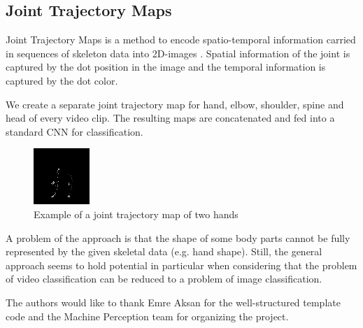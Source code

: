 \subsection{Joint Trajectory Maps}
Joint Trajectory Maps is a method to encode spatio-temporal information carried in sequences of skeleton data into 2D-images \cite{JointTrajectoryMaps16}.
Spatial information of the joint is captured by the dot position in the image and the temporal information is captured by the dot color.

We create a separate joint trajectory map for hand, elbow, shoulder, spine and head of every video clip.
The resulting maps are concatenated and fed into a standard CNN for classification.

\begin{figure}[h!]
\includegraphics{joint-hands.png}
\caption{Example of a joint trajectory map of two hands}
\end{figure}

A problem of the approach is that the shape of some body parts cannot be fully represented by the given skeletal data (e.g. hand shape).
Still, the general approach seems to hold potential in particular when considering that the problem of video classification can be reduced to a problem of image classification.

\begin{acks}
The authors would like to thank Emre Aksan for the well-structured template code and the Machine Perception team for organizing the project.
\end{acks}